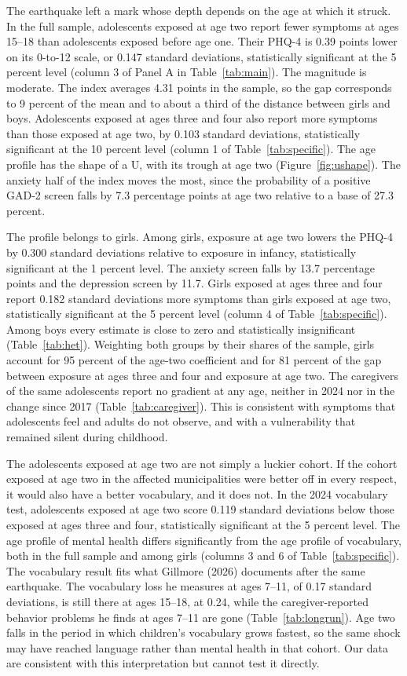 \documentclass[12pt]{article}
\begin{document}
The earthquake left a mark whose depth depends on the age at which it
struck. In the full sample, adolescents exposed at age two report fewer
symptoms at ages 15--18 than adolescents exposed before age one. Their
PHQ-4 is 0.39 points lower on its 0-to-12 scale, or 0.147 standard
deviations, statistically significant at the 5 percent level (column 3 of
Panel A in Table~\ref{tab:main}). The magnitude is moderate. The index
averages 4.31 points in the sample, so the gap corresponds to 9 percent of the mean and to about a third
of the distance between girls and boys. Adolescents exposed at ages three
and four also report more symptoms than those exposed at age two, by 0.103
standard deviations, statistically significant at the 10 percent level
(column 1 of Table~\ref{tab:specific}). The age profile has the shape of a
U, with its trough at age two (Figure~\ref{fig:ushape}). The anxiety half
of the index moves the most, since the probability of a positive GAD-2
screen falls by 7.3 percentage points at age two relative to a base of 27.3
percent.

The profile belongs to girls. Among girls, exposure at age two lowers the
PHQ-4 by 0.300 standard deviations relative to exposure in infancy,
statistically significant at the 1 percent level. The anxiety screen falls
by 13.7 percentage points and the depression screen by 11.7. Girls exposed
at ages three and four report 0.182 standard deviations more symptoms than
girls exposed at age two, statistically significant at the 5 percent level
(column 4 of Table~\ref{tab:specific}). Among boys every estimate is close
to zero and statistically insignificant (Table~\ref{tab:het}). Weighting
both groups by their shares of the sample, girls account for 95 percent of
the age-two coefficient and for 81 percent of the gap between exposure at
ages three and four and exposure at age two. The caregivers of the same
adolescents report no gradient at any age, neither in 2024 nor in the
change since 2017 (Table~\ref{tab:caregiver}). This is consistent with
symptoms that adolescents feel and adults do not observe, and with a
vulnerability that remained silent during childhood.

The adolescents exposed at age two are not simply a luckier cohort. If the
cohort exposed at age two in the affected municipalities were better off in
every respect, it would also have a better vocabulary, and it does not. In
the 2024 vocabulary test, adolescents exposed at age two score 0.119
standard deviations below those exposed at ages three and four,
statistically significant at the 5 percent level. The age profile of
mental health differs significantly from the age profile of vocabulary,
both in the full sample and among girls (columns 3 and 6 of
Table~\ref{tab:specific}). The vocabulary result fits what Gillmore (2026)
documents after the same earthquake. The vocabulary loss he measures at
ages 7--11, of 0.17 standard deviations, is still there at ages 15--18, at
0.24, while the caregiver-reported behavior problems he finds at ages
7--11 are gone (Table~\ref{tab:longrun}). Age two falls in the period in
which children's vocabulary grows fastest, so the same shock may have
reached language rather than mental health in that cohort. Our data are
consistent with this interpretation but cannot test it directly.
\end{document}
